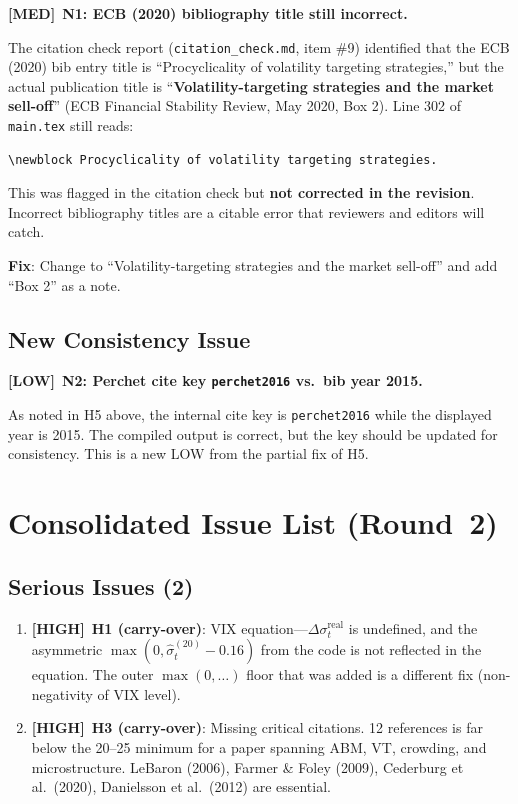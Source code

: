 \documentclass[12pt,a4paper]{article}
\newcommand{\HIGH}{\textbf{\textcolor{errorred}{[HIGH]}}}
\newcommand{\MED}{\textbf{\textcolor{warncolor}{[MED]}}}
\newcommand{\LOW}{\textbf{\textcolor{okgreen}{[LOW]}}}
\begin{document}
\MED\ \textbf{N1: ECB (2020) bibliography title still incorrect.}

The citation check report (\texttt{citation\_check.md}, item \#9) identified that the ECB (2020) bib entry title is ``Procyclicality of volatility targeting strategies,'' but the actual publication title is ``\textbf{Volatility-targeting strategies and the market sell-off}'' (ECB Financial Stability Review, May 2020, Box 2). Line 302 of \texttt{main.tex} still reads:

\begin{verbatim}
\newblock Procyclicality of volatility targeting strategies.
\end{verbatim}

This was flagged in the citation check but \textbf{not corrected in the revision}. Incorrect bibliography titles are a citable error that reviewers and editors will catch.

\textbf{Fix}: Change to ``Volatility-targeting strategies and the market sell-off'' and add ``Box 2'' as a note.

\medskip

\subsection*{New Consistency Issue}

\LOW\ \textbf{N2: Perchet cite key \texttt{perchet2016} vs.\ bib year 2015.}

As noted in H5 above, the internal cite key is \texttt{perchet2016} while the displayed year is 2015. The compiled output is correct, but the key should be updated for consistency. This is a new LOW from the partial fix of H5.


\section*{Consolidated Issue List (Round~2)}

\subsection*{\textcolor{errorred}{Serious Issues (2)}}

\begin{enumerate}
  \item \HIGH\ \textbf{H1 (carry-over)}: VIX equation---$\Delta\sigma^{\text{real}}_t$ is undefined, and the asymmetric $\max(0, \hat{\sigma}^{(20)}_t - 0.16)$ from the code is not reflected in the equation. The outer $\max(0,\ldots)$ floor that was added is a different fix (non-negativity of VIX level).
  \item \HIGH\ \textbf{H3 (carry-over)}: Missing critical citations. 12 references is far below the 20--25 minimum for a paper spanning ABM, VT, crowding, and microstructure. LeBaron (2006), Farmer \& Foley (2009), Cederburg et al.\ (2020), Danielsson et al.\ (2012) are essential.
\end{enumerate}
\end{document}
